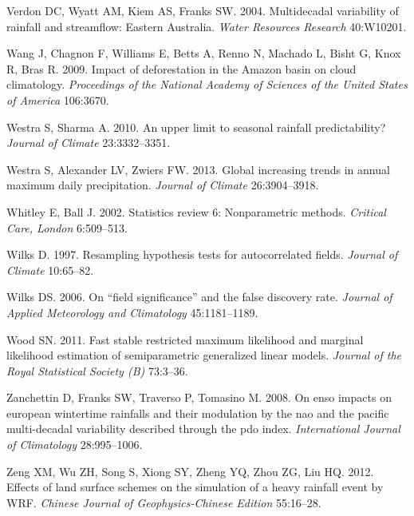 \documentclass[fleqn,10pt,lineno]{wlpeerj} %
\theoremstyle{definition}
\theoremstyle{definition}
\theoremstyle{definition}
\theoremstyle{remark}
\begin{document}
\hypertarget{ref-Verdon2004}{}
Verdon DC, Wyatt AM, Kiem AS, Franks SW. 2004. Multidecadal variability
of rainfall and streamflow: Eastern Australia. \emph{Water Resources
Research} 40:W10201.

\hypertarget{ref-Wang2009}{}
Wang J, Chagnon F, Williams E, Betts A, Renno N, Machado L, Bisht G,
Knox R, Bras R. 2009. Impact of deforestation in the Amazon basin on
cloud climatology. \emph{Proceedings of the National Academy of Sciences
of the United States of America} 106:3670.

\hypertarget{ref-Westra2010}{}
Westra S, Sharma A. 2010. An upper limit to seasonal rainfall
predictability? \emph{Journal of Climate} 23:3332--3351.

\hypertarget{ref-Westra2013}{}
Westra S, Alexander LV, Zwiers FW. 2013. Global increasing trends in
annual maximum daily precipitation. \emph{Journal of Climate}
26:3904--3918.

\hypertarget{ref-Whitley2002}{}
Whitley E, Ball J. 2002. Statistics review 6: Nonparametric methods.
\emph{Critical Care, London} 6:509--513.

\hypertarget{ref-Wilks1997}{}
Wilks D. 1997. Resampling hypothesis tests for autocorrelated fields.
\emph{Journal of Climate} 10:65--82.

\hypertarget{ref-Wilks2006}{}
Wilks DS. 2006. On ``field significance'' and the false discovery rate.
\emph{Journal of Applied Meteorology and Climatology} 45:1181--1189.

\hypertarget{ref-Wood2011}{}
Wood SN. 2011. Fast stable restricted maximum likelihood and marginal
likelihood estimation of semiparametric generalized linear models.
\emph{Journal of the Royal Statistical Society (B)} 73:3--36.

\hypertarget{ref-Zanchettin2008}{}
Zanchettin D, Franks SW, Traverso P, Tomasino M. 2008. On enso impacts
on european wintertime rainfalls and their modulation by the nao and the
pacific multi-decadal variability described through the pdo index.
\emph{International Journal of Climatology} 28:995--1006.

\hypertarget{ref-Zeng2012}{}
Zeng XM, Wu ZH, Song S, Xiong SY, Zheng YQ, Zhou ZG, Liu HQ. 2012.
Effects of land surface schemes on the simulation of a heavy rainfall
event by WRF. \emph{Chinese Journal of Geophysics-Chinese Edition}
55:16--28.
\end{document}
